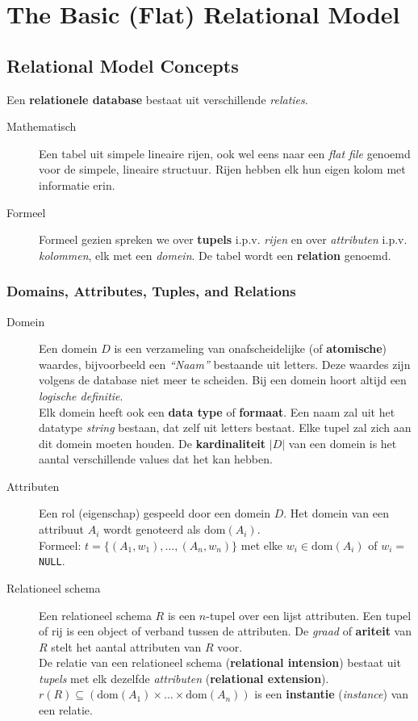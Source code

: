 \chapter{The Basic (Flat) Relational Model}

\section{Relational Model Concepts}
Een \textbf{relationele database} bestaat uit verschillende \textit{relaties}. 
\begin{description}
	\item[Mathematisch] Een tabel uit simpele lineaire rijen, ook wel eens naar een \textit{flat file} genoemd voor de simpele, lineaire structuur. Rijen hebben elk hun eigen kolom met informatie erin.
	\item[Formeel] Formeel gezien spreken we over \textbf{tupels} i.p.v. \textit{rijen} en over \textit{attributen} i.p.v. \textit{kolommen}, elk met een \textit{domein}. De tabel wordt een \textbf{relation} genoemd.
\end{description}

\subsection{Domains, Attributes, Tuples, and Relations}
\begin{description}
	\item[Domein] Een domein $D$ is een verzameling van onafscheidelijke (of \textbf{atomische}) waardes, bijvoorbeeld een \textit{``Naam''} bestaande uit letters. Deze waardes zijn volgens de database niet meer te scheiden. Bij een domein hoort altijd een \textit{logische definitie}.\\
	Elk domein heeft ook een \textbf{data type} of \textbf{formaat}. Een naam zal uit het datatype \textit{string} bestaan, dat zelf uit letters bestaat. Elke tupel zal zich aan dit domein moeten houden. De \textbf{kardinaliteit} $|D|$ van een domein is het aantal verschillende values dat het kan hebben.
	\item[Attributen] Een rol (eigenschap) gespeeld door een domein $D$. Het domein van een attribuut $A_i$ wordt genoteerd als $\text{dom}(A_i)$.\\
	Formeel: $t = \{(A_1, w_1), \dots, (A_n, w_n)\}$ met elke $w_i \in \text{dom}(A_i)$ of $w_i =$ \texttt{NULL}.
	\item[Relationeel schema] Een relationeel schema $R$ is een $n$-tupel over een lijst attributen. Een tupel of rij is een object of verband tussen de attributen. De \textit{graad} of \textbf{ariteit} van $R$ stelt het aantal attributen van $R$ voor.\\
	De relatie van een relationeel schema (\textbf{relational intension}) bestaat uit \textit{tupels} met elk dezelfde \textit{attributen} (\textbf{relational extension}).\\
	$r(R) \subseteq ( \text{dom}(A_1) \times \dots \times \text{dom}(A_n))$ is een \textbf{instantie} (\textit{instance}) van een relatie.
\end{description}

